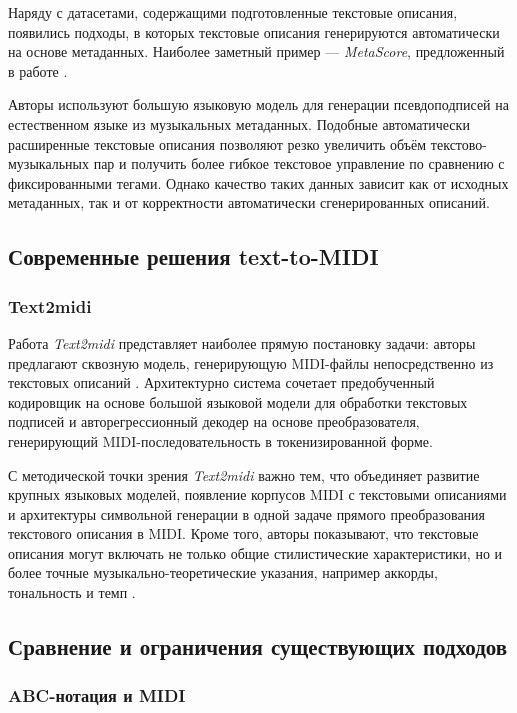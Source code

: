 \documentclass[a4paper,12pt]{extarticle}
\begin{document}
Наряду с датасетами, содержащими подготовленные текстовые описания,
появились подходы, в которых текстовые описания генерируются
автоматически на основе метаданных. Наиболее заметный пример ---
\textit{MetaScore}, предложенный в работе \cite{xu2025metascore}.

Авторы используют большую языковую модель для генерации псевдоподписей
на естественном языке из музыкальных метаданных. Подобные автоматически
расширенные текстовые описания позволяют резко увеличить объём
текстово-музыкальных пар и получить более гибкое текстовое управление по
сравнению с фиксированными тегами. Однако качество таких данных зависит
как от исходных метаданных, так и от корректности автоматически
сгенерированных описаний.

\subsection{Современные решения text-to-MIDI}

\subsubsection{Text2midi}

Работа \textit{Text2midi} представляет наиболее прямую постановку
задачи: авторы предлагают сквозную модель, генерирующую MIDI-файлы
непосредственно из текстовых описаний \cite{bhandari2025text2midi}.
Архитектурно система сочетает предобученный кодировщик на основе большой
языковой модели для обработки текстовых подписей и авторегрессионный
декодер на основе преобразователя, генерирующий MIDI-последовательность
в токенизированной форме.

С методической точки зрения \textit{Text2midi} важно тем, что объединяет
развитие крупных языковых моделей, появление корпусов MIDI с текстовыми
описаниями и архитектуры символьной генерации в одной задаче прямого
преобразования текстового описания в MIDI. Кроме того, авторы
показывают, что текстовые описания могут включать не только общие
стилистические характеристики, но и более точные музыкально-теоретические
указания, например аккорды, тональность и темп
\cite{bhandari2025text2midi}.

\subsection{Сравнение и ограничения существующих подходов}

\subsubsection{ABC-нотация и MIDI}
\end{document}
